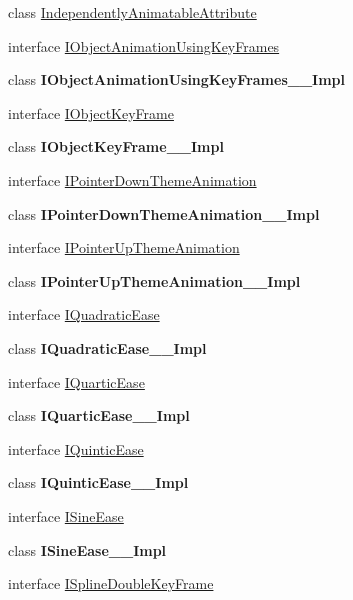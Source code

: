 \begin{DoxyCompactItemize}
class \hyperlink{class_windows_1_1_u_i_1_1_xaml_1_1_media_1_1_animation_1_1_independently_animatable_attribute}{Independently\+Animatable\+Attribute}
\item 
interface \hyperlink{interface_windows_1_1_u_i_1_1_xaml_1_1_media_1_1_animation_1_1_i_object_animation_using_key_frames}{I\+Object\+Animation\+Using\+Key\+Frames}
\item 
class {\bfseries I\+Object\+Animation\+Using\+Key\+Frames\+\_\+\+\_\+\+Impl}
\item 
interface \hyperlink{interface_windows_1_1_u_i_1_1_xaml_1_1_media_1_1_animation_1_1_i_object_key_frame}{I\+Object\+Key\+Frame}
\item 
class {\bfseries I\+Object\+Key\+Frame\+\_\+\+\_\+\+Impl}
\item 
interface \hyperlink{interface_windows_1_1_u_i_1_1_xaml_1_1_media_1_1_animation_1_1_i_pointer_down_theme_animation}{I\+Pointer\+Down\+Theme\+Animation}
\item 
class {\bfseries I\+Pointer\+Down\+Theme\+Animation\+\_\+\+\_\+\+Impl}
\item 
interface \hyperlink{interface_windows_1_1_u_i_1_1_xaml_1_1_media_1_1_animation_1_1_i_pointer_up_theme_animation}{I\+Pointer\+Up\+Theme\+Animation}
\item 
class {\bfseries I\+Pointer\+Up\+Theme\+Animation\+\_\+\+\_\+\+Impl}
\item 
interface \hyperlink{interface_windows_1_1_u_i_1_1_xaml_1_1_media_1_1_animation_1_1_i_quadratic_ease}{I\+Quadratic\+Ease}
\item 
class {\bfseries I\+Quadratic\+Ease\+\_\+\+\_\+\+Impl}
\item 
interface \hyperlink{interface_windows_1_1_u_i_1_1_xaml_1_1_media_1_1_animation_1_1_i_quartic_ease}{I\+Quartic\+Ease}
\item 
class {\bfseries I\+Quartic\+Ease\+\_\+\+\_\+\+Impl}
\item 
interface \hyperlink{interface_windows_1_1_u_i_1_1_xaml_1_1_media_1_1_animation_1_1_i_quintic_ease}{I\+Quintic\+Ease}
\item 
class {\bfseries I\+Quintic\+Ease\+\_\+\+\_\+\+Impl}
\item 
interface \hyperlink{interface_windows_1_1_u_i_1_1_xaml_1_1_media_1_1_animation_1_1_i_sine_ease}{I\+Sine\+Ease}
\item 
class {\bfseries I\+Sine\+Ease\+\_\+\+\_\+\+Impl}
\item 
interface \hyperlink{interface_windows_1_1_u_i_1_1_xaml_1_1_media_1_1_animation_1_1_i_spline_double_key_frame}{I\+Spline\+Double\+Key\+Frame}

\end{DoxyCompactItemize}
